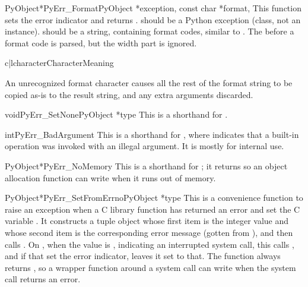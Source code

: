 \begin{cfuncdesc}{PyObject*}{PyErr_Format}{PyObject *exception,
                                           const char *format, \moreargs}
  This function sets the error indicator and returns \NULL.
   should be a Python exception (class, not
  an instance).   should be a string, containing format
  codes, similar to . The 
  before a format code is parsed, but the width part is ignored.

  \begin{tableii}{c|l}{character}{Character}{Meaning}
  \end{tableii}

  An unrecognized format character causes all the rest of the format
  string to be copied as-is to the result string, and any extra
  arguments discarded.
\end{cfuncdesc}

\begin{cfuncdesc}{void}{PyErr_SetNone}{PyObject *type}
  This is a shorthand for .
\end{cfuncdesc}

\begin{cfuncdesc}{int}{PyErr_BadArgument}{}
  This is a shorthand for , where  indicates that a built-in
  operation was invoked with an illegal argument.  It is mostly for
  internal use.
\end{cfuncdesc}

\begin{cfuncdesc}{PyObject*}{PyErr_NoMemory}{}
  This is a shorthand for ; it
  returns \NULL{} so an object allocation function can write
   when it runs out of memory.
\end{cfuncdesc}

\begin{cfuncdesc}{PyObject*}{PyErr_SetFromErrno}{PyObject *type}
  This is a convenience function to raise an exception when a C
  library function has returned an error and set the C variable
  .  It constructs a tuple object whose first item is the
  integer  value and whose second item is the
  corresponding error message (gotten from
  ), and then calls
  .  On \UNIX, when
  the  value is , indicating an
  interrupted system call, this calls
  , and if that set the error
  indicator, leaves it set to that.  The function always returns
  \NULL, so a wrapper function around a system call can write
   when the system call
  returns an error.
\end{cfuncdesc}

